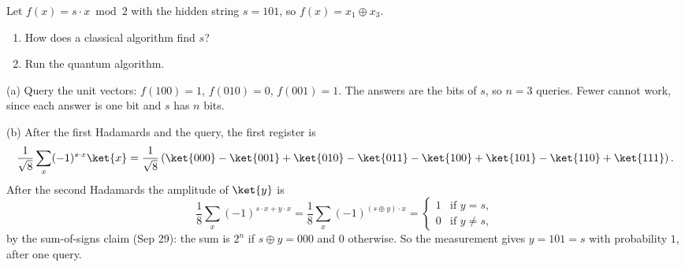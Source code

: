 
\begin{exercisebox}
\begin{pproblem}[Bernstein--Vazirani with $n = 3$]\label{pp:bv}
    Let $f(x) = s \cdot x \bmod 2$ with the hidden string $s = 101$, so $f(x) = x_1 \oplus x_3$.
    \begin{enumerate}[label=(\alph*)]
        \item How does a classical algorithm find $s$?
        \item Run the quantum algorithm.
    \end{enumerate}
\end{pproblem}
\tcblower
\begin{wsolution}
    (a) Query the unit vectors: $f(100) = 1$, $f(010) = 0$, $f(001) = 1$. The answers are the bits
    of $s$, so $n = 3$ queries. Fewer cannot work, since each answer is one bit and $s$ has $n$ bits.

    (b) After the first Hadamards and the query, the first register is
    \[\frac{1}{\sqrt{8}} \sum_{x} (-1)^{s \cdot x} \ket{x}
        = \frac{1}{\sqrt{8}} \left(\ket{000} - \ket{001} + \ket{010} - \ket{011} - \ket{100} + \ket{101} - \ket{110} + \ket{111}\right).\]
    After the second Hadamards the amplitude of $\ket{y}$ is
    \[\frac{1}{8} \sum_{x} (-1)^{s \cdot x + y \cdot x} = \frac{1}{8} \sum_{x} (-1)^{(s \oplus y) \cdot x}
        = \begin{cases} 1 & \text{if } y = s, \\ 0 & \text{if } y \neq s, \end{cases}\]
    by the sum-of-signs claim (Sep 29): the sum is $2^n$ if $s \oplus y = 000$ and $0$ otherwise.
    So the measurement gives $y = 101 = s$ with probability $1$, after one query.
\end{wsolution}
\end{exercisebox}

